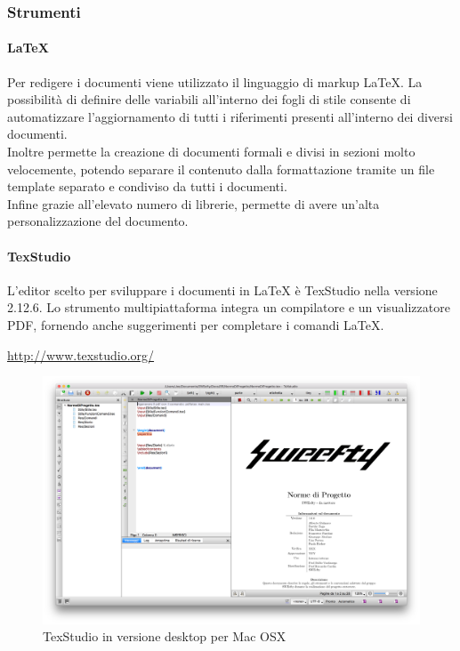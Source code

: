 	\subsubsection{Strumenti}
		\paragraph{\LaTeX}\Spazio
		Per redigere i documenti viene utilizzato il linguaggio di markup \LaTeX. La possibilità di definire delle variabili all'interno dei fogli di stile consente di automatizzare l'aggiornamento di tutti i riferimenti presenti all'interno dei diversi documenti.\\
		Inoltre permette la creazione di documenti formali e divisi in sezioni molto velocemente, potendo separare il contenuto dalla formattazione tramite un file template separato e condiviso da tutti i documenti.\\
		Infine grazie all'elevato numero di librerie, permette di avere un'alta personalizzazione del documento.
		\paragraph{TexStudio}\Spazio
		L'editor scelto per sviluppare i documenti in \LaTeX\text{ } è TexStudio nella versione 2.12.6. 
		Lo strumento multipiattaforma integra un compilatore e un visualizzatore PDF, fornendo anche suggerimenti per completare i comandi \LaTeX.
		\newline\centerline{\href{http://www.texstudio.org/}{http://www.texstudio.org/}}
		\begin{figure}[H]
				\centering
				\includegraphics[width=1\textwidth]{Images/texstudio.png}
				\caption{TexStudio in versione desktop per Mac OSX}
			\end{figure}
			
